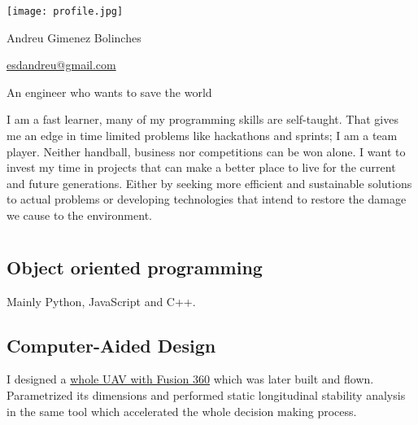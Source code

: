 \documentclass[]{infinity-cv}
\begin{document}
\begingroup
\hypersetup{ hidelinks, pdfnewwindow}
\begin{minipage}{0.15\textwidth} %
    \texttt{[image: profile.jpg]}
\end{minipage}
\hfill
\begin{minipage}{0.6\textwidth}
    \centering
    {\Huge\color{heading}Andreu Gimenez Bolinches}
    
    \medskip
    
    \hfill
    \href{mailto:esdandreu@gmail.com}{
        \faEnvelope\hspace{1pt} esdandreu@gmail.com
    } \hfill
    \href{https://www.linkedin.com/in/andreu-gimenez-bolinches-esdandreu/}{
        \faLinkedin
    } \hfill
    \href{https://esdandreu.herokuapp.com}{\faGlobe} \hfill
    \href{https://stackoverflow.com/users/13180090/andreu-gimenez}{
        \faStackOverflow
    } \hfill
    \href{https://github.com/esdandreu}{\faGithub} \hfill
    \href{https://gitlab.com/esdandreu}{\faGitlab} \hfill
    
    \medskip
    An engineer who wants to save the world
\end{minipage}
\hfill
\begin{minipage}{0.15\textwidth}
\end{minipage}
\medskip
\endgroup

\medskip
I am a fast learner, many of my programming skills are self-taught. That gives
me an edge in time limited problems like hackathons and sprints; I am a team
player. Neither handball, business nor competitions can be won alone. I want to
invest my time in projects that can make a better place to live for the current
and future generations. Either by seeking more efficient and sustainable
solutions to actual problems or developing technologies that intend to restore
the damage we cause to the environment.

\section{\faWrench}
\subsection{Object oriented programming}
Mainly Python, JavaScript and C++.
\subsection{Computer-Aided Design}
I designed a
\href{https://1drv.ms/b/s!AqZvnCxLmXx9hL9DSw-Ee4zU6H5Rcw?e=8hDatB}{whole UAV
with Fusion 360} which was later built and flown. Parametrized its dimensions
and performed static longitudinal stability analysis in the same tool which
accelerated the whole decision making process.
\end{document}
